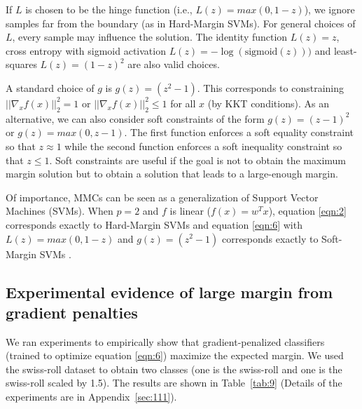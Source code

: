 \documentclass{article}
\begin{document}
If $L$ is chosen to be the hinge function (i.e., $L(z)=max(0,1-z)$),
we ignore samples far from the boundary (as in Hard-Margin SVMs). For general choices of $L$, every sample may influence the solution. The identity function $L(z)=z$, cross entropy with sigmoid activation $L(z)=-\log(\text{sigmoid}(z)))$ and least-squares $L(z)=(1-z)^2$ are also valid choices.

A standard choice of $g$ is $g(z)=(z^2-1)$. This corresponds to constraining $|| \nabla_x f(x) ||_2^2 = 1$ or $|| \nabla_x f(x) ||_2^2 \leq 1$ for all $x$ (by KKT conditions). As an alternative, we can also consider soft constraints of the form $g(z)=(z-1)^2$ or $g(z)=max(0,z-1)$. The first function enforces a soft equality constraint so that $z\approx 1$  while the second function enforces a soft inequality constraint so that $z \leq 1$. Soft constraints are useful if the goal is not to obtain the maximum margin solution but to obtain a solution that leads to a large-enough margin.

Of importance, MMCs can be seen as a generalization of Support Vector Machines (SVMs). When $p=2$ and $f$ is linear ($f(x)=w^T x$), equation \ref{eqn:2} corresponds exactly to Hard-Margin SVMs and equation \ref{eqn:6} with $L(z)=max(0,1-z)$ and $g(z)=(z^2-1)$ corresponds exactly to Soft-Margin SVMs \citep{cortes1995support}.

\subsection{Experimental evidence of large margin from gradient penalties}

We ran experiments to empirically show that gradient-penalized classifiers (trained to optimize equation \ref{eqn:6}) maximize the expected margin. We used the swiss-roll dataset \citep{marsland2015machine} to obtain two classes (one is the swiss-roll and one is the swiss-roll scaled by 1.5).  The results are shown in Table~\ref{tab:9} (Details of the experiments are in Appendix~\ref{sec:111}).
\end{document}
